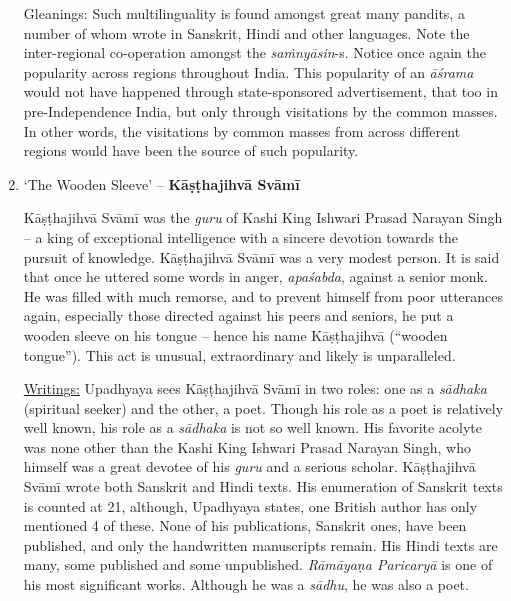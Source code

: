 \begin{enumerate}
 Gleanings: Such multilinguality is found amongst great many pandits, a number of whom wrote in Sanskrit, Hindi and other languages. Note the inter-regional co-operation amongst the \textit{saṁnyāsin}-s. Notice once again the popularity across regions throughout India. This popularity of an \textit{āśrama} would not have happened through state-sponsored advertisement, that too in pre-Independence India, but only through visitations by the common masses. In other words, the visitations by common masses from across different regions would have been the source of such popularity.

 \item 
 ‘The Wooden Sleeve’ – \textbf{Kāṣṭhajihvā Svāmī}

 Kāṣṭhajihvā Svāmī was the \textit{guru} of Kashi King Ishwari Prasad Narayan Singh – a king of exceptional intelligence with a sincere devotion towards the pursuit of knowledge. Kāṣṭhajihvā Svāmī was a very modest person. It is said that once he uttered some words in anger, \textit{apaśabda}, against a senior monk. He was filled with much remorse, and to prevent himself from poor utterances again, especially those directed against his peers and seniors, he put a wooden sleeve on his tongue – hence his name Kāṣṭhajihvā (“wooden tongue”). This act is unusual, extraordinary and likely is unparalleled.

 \underline{Writings:} Upadhyaya sees Kāṣṭhajihvā Svāmī in two roles: one as a \textit{sādhaka} (spiritual seeker) and the other, a poet. Though his role as a poet is relatively well known, his role as a \textit{sādhaka} is not so well known. His favorite acolyte was none other than the Kashi King Ishwari Prasad Narayan Singh, who himself was a great devotee of his \textit{guru} and a serious scholar. Kāṣṭhajihvā Svāmī wrote both Sanskrit and Hindi texts. His enumeration of Sanskrit texts is counted at 21, although, Upadhyaya states, one British author has only mentioned 4 of these. None of his publications, Sanskrit ones, have been published, and only the handwritten manuscripts remain. His Hindi texts are many, some published and some unpublished. \textit{Rāmāyaṇa Paricaryā} is one of his most significant works. Although he was a \textit{sādhu}, he was also a poet.


\end{enumerate}
